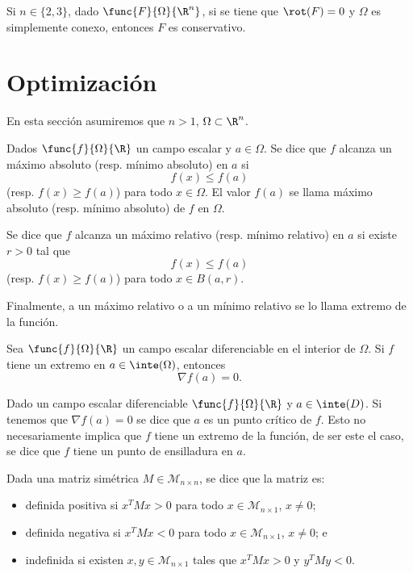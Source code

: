 \documentclass[a4,11pt]{aleph-notas}
\begin{document}
\begin{prop}
    Si $n\in\{2,3\}$, dado $\func{F}{\Omega}{\R^n}$, si se tiene que $\rot(F)=0$ y $\Omega$ es simplemente conexo, entonces $F$ es conservativo.
\end{prop}


\section{Optimización}


En esta sección asumiremos que $n>1$, $\Omega\subset \R^n$.

\begin{defi}
    Dados $\func{f}{\Omega}{\R}$ un campo escalar y $a\in \Omega$. Se dice que $f$ alcanza un máximo absoluto (resp. mínimo absoluto) en $a$ si
    \[
        f(x) \leq f(a)
    \]
    (resp. $f(x) \geq f(a)$) para todo $x\in \Omega$. El valor $f(a)$ se llama máximo absoluto (resp. mínimo absoluto) de $f$ en $\Omega$.
    
    Se dice que $f$ alcanza un máximo relativo (resp. mínimo relativo) en $a$ si existe $r>0$ tal que
    \[
        f(x) \leq f(a)
    \]
    (resp. $f(x) \geq f(a)$) para todo $x\in B(a,r)$.
    
    Finalmente, a un máximo relativo o a un mínimo relativo se lo llama extremo de la función.
\end{defi}
 

\begin{teo}
    Sea $\func{f}{\Omega}{\R}$ un campo escalar diferenciable en el interior de $\Omega$. Si $f$ tiene un extremo en $a\in\inte(\Omega)$, entonces 
    \[
        \nabla f(a) = 0.
    \]
\end{teo}

\begin{advertencia}
    Dado un campo escalar diferenciable $\func{f}{\Omega}{\R}$ y $a\in\inte(D)$. Si tenemos que $\nabla f(a)=0$ se dice que $a$ es un punto crítico de $f$. Esto no necesariamente implica que $f$ tiene un extremo de la función, de ser este el caso, se dice que $f$ tiene un punto de ensilladura en $a$.
\end{advertencia}

\begin{defi}
    Dada una matriz simétrica $M\in \mathcal{M}_{n\times n}$, se dice que la matriz es:
    \begin{itemize}
        \item definida positiva si $x^TMx>0$ para todo $x\in \mathcal{M}_{n\times 1}$, $x\neq 0$;
        \item definida negativa si $x^TMx<0$ para todo $x\in \mathcal{M}_{n\times 1}$, $x\neq 0$; e
        \item indefinida si existen $x,y\in \mathcal{M}_{n\times 1}$ tales que $x^TMx>0$ y $y^TMy<0$.
    \end{itemize}
\end{defi}
 
\end{document}
